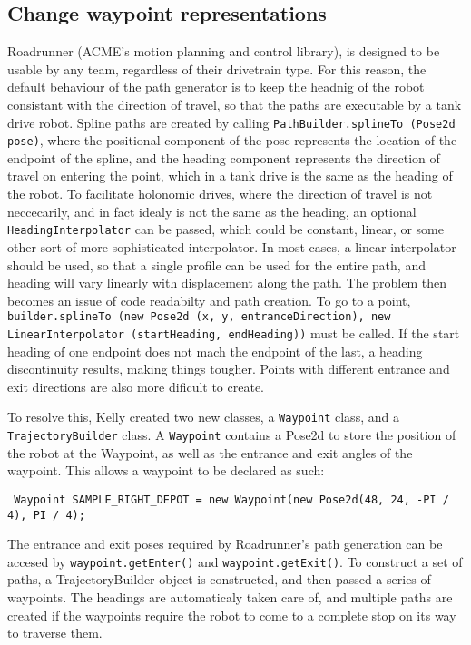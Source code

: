 \documentclass{article}
\newif\ifcontents
\begin{document}
\contentsfalse

\subsection {Change waypoint representations}
Roadrunner (ACME's motion planning and control library), is designed to be usable by any team, regardless of their drivetrain type. For this reason, the default behaviour of the path generator is to keep the headnig of the robot consistant with the direction of travel, so that the paths are executable by a tank drive robot. Spline paths are created by calling \texttt{PathBuilder.splineTo (Pose2d pose)}, where the positional component of the pose represents the location of the endpoint of the spline, and the heading component represents the direction of travel on entering the point, which in a tank drive is the same as the heading of the robot. To facilitate holonomic drives, where the direction of travel is not neccecarily, and in fact idealy is not the same as the heading, an optional \texttt{HeadingInterpolator} can be passed, which could be constant, linear, or some other sort of more sophisticated interpolator. In most cases, a linear interpolator should be used, so that a single profile can be used for the entire path, and heading will vary linearly with displacement along the path. The problem then becomes an issue of code readabilty and path creation. To go to a point, \texttt{builder.splineTo (new Pose2d (x, y, entranceDirection), new LinearInterpolator (startHeading, endHeading))} must be called. If the start heading of one endpoint does not mach the endpoint of the last, a heading discontinuity results, making things tougher. Points with different entrance and exit directions are also more dificult to create.

To resolve this, Kelly created two new classes, a \texttt{Waypoint} class, and a \texttt{TrajectoryBuilder} class. A \texttt{Waypoint} contains a Pose2d to store the position of the robot at the Waypoint, as well as the entrance and exit angles of the waypoint. This allows a waypoint to be declared as such:

 \lstinline{ Waypoint SAMPLE_RIGHT_DEPOT = new Waypoint(new Pose2d(48, 24, -PI / 4), PI / 4); }

The entrance and exit poses required by Roadrunner's path generation can be accesed by \texttt{waypoint.getEnter()} and \texttt{waypoint.getExit()}. To construct a set of paths, a TrajectoryBuilder object is constructed, and then passed a series of waypoints. The headings are automaticaly taken care of, and multiple paths are created if the waypoints require the robot to come to a complete stop on its way to traverse them. 
\end{document}
